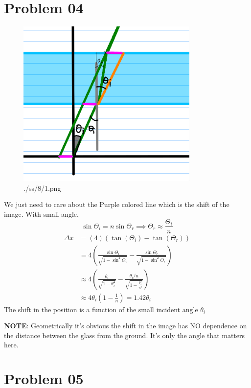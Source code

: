\documentclass[letter]{article}
\begin{document}
\section*{Problem 04} 
\begin{figure}[H]
	\centering
	\includegraphics[width=0.8\textwidth]{./ss/8/1.png}
	\caption{./ss/8/1.png}
	\label{fig:-ss-8-1-png}
\end{figure}
We just need to care about the Purple colored line which is the shift of the image. 
With small angle, \[
\sin \Theta_i = n \sin \Theta_r \implies \Theta_r \approx \frac{\Theta_i}{n}
\] 
\begin{align*}
	\Delta x &= (4) (\tan\left(\Theta_i\right)  - \tan \left(\Theta_r\right))\\ 
	&= 4 \left(
\frac{\sin \Theta_i}{\sqrt{1 - \sin ^2 \Theta_i} } -
\frac{\sin \Theta_r}{\sqrt{1 - \sin ^2 \Theta_r} }
\right) \\ &
	\approx 4 
	\left(
\frac{\theta_i}{\sqrt{1 - \theta_i^2} } - 
\frac{\theta_i / n }{\sqrt{1 - \frac{\theta_i^2}{n^2}} }
	\right)
	\\ &
	\approx 4 \theta_i \left(1 - \frac{1}{n}\right) = 1.42 \theta_i
\end{align*}
The shift in the position is a function of the small incident angle $\theta_i$ 


\textbf{NOTE}: Geometrically it's obvious the shift in the image has NO dependence on the distance between the glass from the ground. It's only the angle that matters here.


\section*{Problem 05} 
\end{document}
